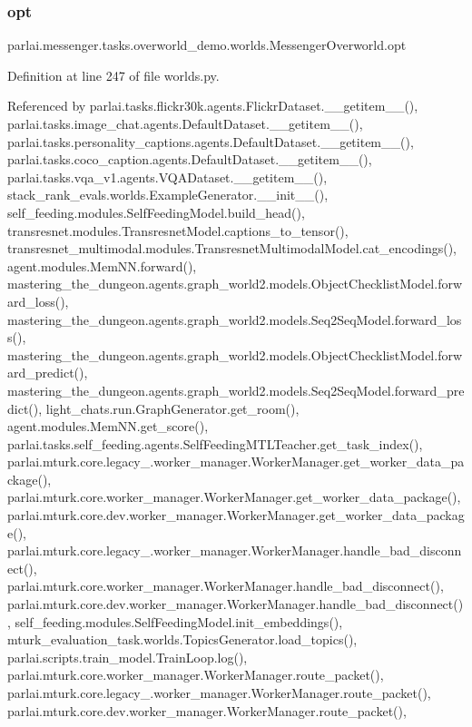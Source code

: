 \subsubsection{\texorpdfstring{opt}{opt}}
{\footnotesize\ttfamily parlai.\+messenger.\+tasks.\+overworld\+\_\+demo.\+worlds.\+Messenger\+Overworld.\+opt}



Definition at line 247 of file worlds.\+py.



Referenced by parlai.\+tasks.\+flickr30k.\+agents.\+Flickr\+Dataset.\+\_\+\+\_\+getitem\+\_\+\+\_\+(), parlai.\+tasks.\+image\+\_\+chat.\+agents.\+Default\+Dataset.\+\_\+\+\_\+getitem\+\_\+\+\_\+(), parlai.\+tasks.\+personality\+\_\+captions.\+agents.\+Default\+Dataset.\+\_\+\+\_\+getitem\+\_\+\+\_\+(), parlai.\+tasks.\+coco\+\_\+caption.\+agents.\+Default\+Dataset.\+\_\+\+\_\+getitem\+\_\+\+\_\+(), parlai.\+tasks.\+vqa\+\_\+v1.\+agents.\+V\+Q\+A\+Dataset.\+\_\+\+\_\+getitem\+\_\+\+\_\+(), stack\+\_\+rank\+\_\+evals.\+worlds.\+Example\+Generator.\+\_\+\+\_\+init\+\_\+\+\_\+(), self\+\_\+feeding.\+modules.\+Self\+Feeding\+Model.\+build\+\_\+head(), transresnet.\+modules.\+Transresnet\+Model.\+captions\+\_\+to\+\_\+tensor(), transresnet\+\_\+multimodal.\+modules.\+Transresnet\+Multimodal\+Model.\+cat\+\_\+encodings(), agent.\+modules.\+Mem\+N\+N.\+forward(), mastering\+\_\+the\+\_\+dungeon.\+agents.\+graph\+\_\+world2.\+models.\+Object\+Checklist\+Model.\+forward\+\_\+loss(), mastering\+\_\+the\+\_\+dungeon.\+agents.\+graph\+\_\+world2.\+models.\+Seq2\+Seq\+Model.\+forward\+\_\+loss(), mastering\+\_\+the\+\_\+dungeon.\+agents.\+graph\+\_\+world2.\+models.\+Object\+Checklist\+Model.\+forward\+\_\+predict(), mastering\+\_\+the\+\_\+dungeon.\+agents.\+graph\+\_\+world2.\+models.\+Seq2\+Seq\+Model.\+forward\+\_\+predict(), light\+\_\+chats.\+run.\+Graph\+Generator.\+get\+\_\+room(), agent.\+modules.\+Mem\+N\+N.\+get\+\_\+score(), parlai.\+tasks.\+self\+\_\+feeding.\+agents.\+Self\+Feeding\+M\+T\+L\+Teacher.\+get\+\_\+task\+\_\+index(), parlai.\+mturk.\+core.\+legacy\+\_.\+worker\+\_\+manager.\+Worker\+Manager.\+get\+\_\+worker\+\_\+data\+\_\+package(), parlai.\+mturk.\+core.\+worker\+\_\+manager.\+Worker\+Manager.\+get\+\_\+worker\+\_\+data\+\_\+package(), parlai.\+mturk.\+core.\+dev.\+worker\+\_\+manager.\+Worker\+Manager.\+get\+\_\+worker\+\_\+data\+\_\+package(), parlai.\+mturk.\+core.\+legacy\+\_.\+worker\+\_\+manager.\+Worker\+Manager.\+handle\+\_\+bad\+\_\+disconnect(), parlai.\+mturk.\+core.\+worker\+\_\+manager.\+Worker\+Manager.\+handle\+\_\+bad\+\_\+disconnect(), parlai.\+mturk.\+core.\+dev.\+worker\+\_\+manager.\+Worker\+Manager.\+handle\+\_\+bad\+\_\+disconnect(), self\+\_\+feeding.\+modules.\+Self\+Feeding\+Model.\+init\+\_\+embeddings(), mturk\+\_\+evaluation\+\_\+task.\+worlds.\+Topics\+Generator.\+load\+\_\+topics(), parlai.\+scripts.\+train\+\_\+model.\+Train\+Loop.\+log(), parlai.\+mturk.\+core.\+worker\+\_\+manager.\+Worker\+Manager.\+route\+\_\+packet(), parlai.\+mturk.\+core.\+legacy\+\_.\+worker\+\_\+manager.\+Worker\+Manager.\+route\+\_\+packet(), parlai.\+mturk.\+core.\+dev.\+worker\+\_\+manager.\+Worker\+Manager.\+route\+\_\+packet(), 